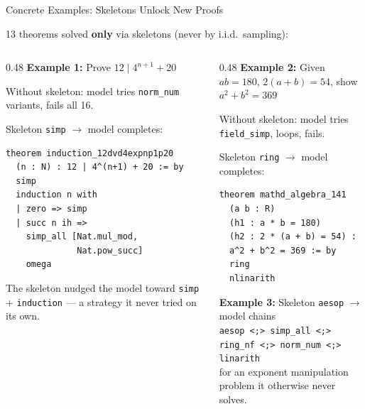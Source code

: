 \documentclass[aspectratio=169]{beamer}
\begin{document}
\begin{frame}[fragile]{Concrete Examples: Skeletons Unlock New Proofs}

13 theorems solved \textbf{only} via skeletons (never by i.i.d.\ sampling):

\vspace{0.3em}
\begin{columns}
\begin{column}{0.48\textwidth}
\textbf{Example 1:} Prove $12 \mid 4^{n+1} + 20$

\vspace{0.2em}
{\scriptsize Without skeleton: model tries \texttt{norm\_num} variants, fails all 16.}

\vspace{0.2em}
Skeleton \texttt{simp} $\to$ model completes:
\begin{lstlisting}[style=lean]
theorem induction_12dvd4expnp1p20
  (n : N) : 12 | 4^(n+1) + 20 := by
  simp
  induction n with
  | zero => simp
  | succ n ih =>
    simp_all [Nat.mul_mod,
              Nat.pow_succ]
    omega
\end{lstlisting}

{\scriptsize The skeleton nudged the model toward \texttt{simp} + \texttt{induction} --- a strategy it never tried on its own.}
\end{column}
\begin{column}{0.48\textwidth}
\textbf{Example 2:} Given $ab{=}180$, $2(a{+}b){=}54$, show $a^2{+}b^2{=}369$

\vspace{0.2em}
{\scriptsize Without skeleton: model tries \texttt{field\_simp}, loops, fails.}

\vspace{0.2em}
Skeleton \texttt{ring} $\to$ model completes:
\begin{lstlisting}[style=lean]
theorem mathd_algebra_141
  (a b : R)
  (h1 : a * b = 180)
  (h2 : 2 * (a + b) = 54) :
  a^2 + b^2 = 369 := by
  ring
  nlinarith
\end{lstlisting}

\vspace{0.5em}
\textbf{Example 3:} Skeleton \texttt{aesop} $\to$ model chains\\
{\scriptsize \texttt{aesop <;> simp\_all <;> ring\_nf <;> norm\_num <;> linarith}}\\
{\scriptsize for an exponent manipulation problem it otherwise never solves.}
\end{column}
\end{columns}
\end{frame}
\end{document}
